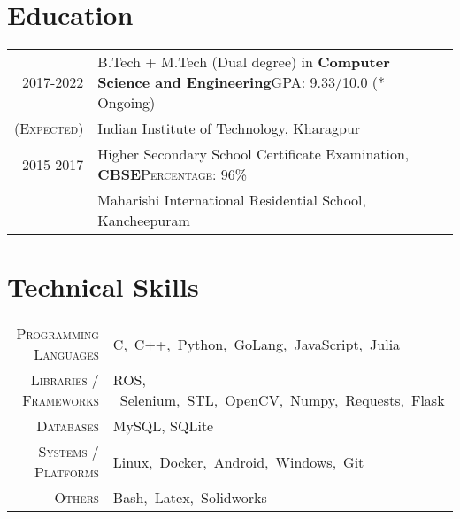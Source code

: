 \documentclass[a4paper,10pt]{extarticle} %
\begin{document}
\section{\textcolor{primary}{Education}}
\begin{tabular}{r|p{17.5cm}}	
2017-2022 & B.Tech + M.Tech (Dual degree) in \textbf{Computer Science and Engineering}\hfill\textsc{GPA: } 9.33/10.0 (* Ongoing)\\
\textsc{(Expected)}& Indian Institute of Technology, Kharagpur \hfill\\
2015-2017 & Higher Secondary School Certificate Examination, \textbf{CBSE}\hfill\textsc{Percentage: } 96\% \\
& Maharishi International Residential School, Kancheepuram \hfill\\
\end{tabular}


\vspace{-0.1cm}
\section{\textcolor{primary}{Technical Skills}}
\begin{tabular}{r|p{15cm}}
\textsc{Programming Languages} & C,\ C++,\ Python,\ GoLang,\ JavaScript,\ Julia \\
\textsc{Libraries / Frameworks} & ROS, \ Selenium,\ STL,\ OpenCV,\ Numpy,\ Requests,\ Flask \\
\textsc{Databases} & MySQL, SQLite\\
\textsc{Systems / Platforms} & Linux,\ Docker,\ Android,\ Windows,\ Git \\
\textsc{Others} & Bash,\ Latex,\ Solidworks \\
\end{tabular}

\vspace{-0.15cm}
\end{document}
